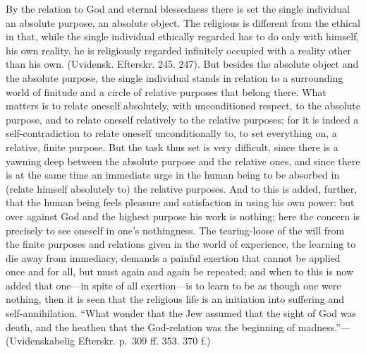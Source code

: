 \documentclass[12pt,a4paper]{book}
\newcommand{\opage}[1]{\marginnote{\footnotesize\textit{[#1]}}}
\begin{document}
By the relation to God and eternal blessedness there is set the single
individual an absolute purpose, an absolute object. The religious is
different from the ethical in that, while the single individual ethically
regarded has to do only with himself, his own reality, he is religiously
regarded infinitely occupied with a reality other than his own.
(Uvidensk. Efterskr. 245. 247). But besides the absolute object and the
absolute purpose, the single individual stands in relation to a
surrounding world of finitude and a circle of relative purposes that
belong there. What matters is to relate oneself absolutely, with
unconditioned respect, to the absolute purpose, and to relate oneself
relatively to the relative purposes; for it is indeed a self-contradiction
to relate oneself unconditionally to, to set everything on, a relative,
finite purpose. But the task thus set is very difficult, since there is a
yawning deep between the absolute purpose and the relative ones, and since
there is at the same time an immediate urge in the human being to be
absorbed in (relate himself absolutely to) the relative purposes. And to
this is added, further, that the human being feels pleasure and
satisfaction in using his own power: but over against God and the highest
purpose his work is nothing; here the concern is precisely to see oneself
in one's nothingness. The tearing-loose of the will from the finite
purposes and relations given in the world of experience, the learning to
die away from immediacy, demands a painful exertion that
\opage{112}cannot be applied once and for all, but must again and again be
repeated; and when to this is now added that one---in spite of all
exertion---is to learn to be as though one were nothing, then it is seen
that the religious life is an initiation into suffering and
self-annihilation. ``What wonder that the Jew assumed that the sight of
God was death, and the heathen that the God-relation was the beginning of
madness.''---(Uvidenskabelig Efterskr. p.~309 ff. 353. 370 f.)
\end{document}
